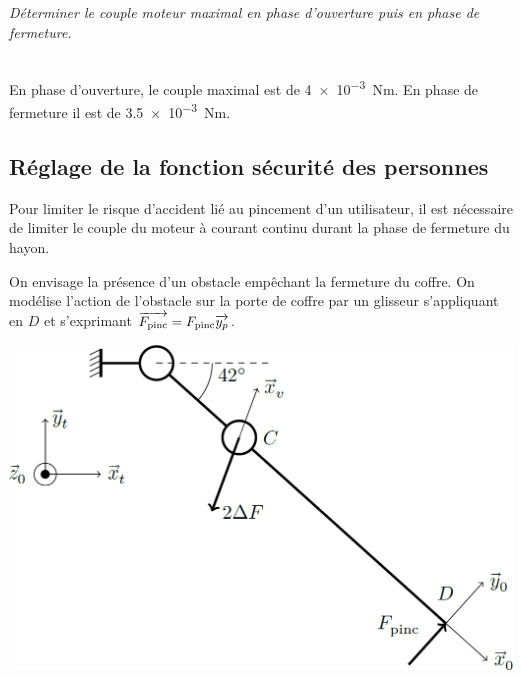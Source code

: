 \documentclass[10pt,fleqn]{article} %
\begin{document}
\begin{multicols}{2}
\subparagraph{}
\textit{Déterminer le couple moteur maximal en phase d’ouverture puis en phase de fermeture.}
\ifprof
\begin{corrige}~\\
En phase d'ouverture, le couple maximal est de \SI{4e-3}{Nm}. En phase de fermeture il est de \SI{3,5e-3}{Nm}.
\end{corrige}
\else
\fi


\subsection*{Réglage de la fonction sécurité des personnes}
Pour limiter le risque d’accident lié au pincement d’un utilisateur, il est nécessaire de limiter le couple du moteur
à courant continu durant la phase de fermeture du hayon. %



On envisage la présence d’un obstacle empêchant la fermeture du coffre. On modélise l’action de l’obstacle sur la porte de coffre par un glisseur s’appliquant en $D$ et s’exprimant $\overrightarrow{F_{\text{pinc}}} = F_{\text{pinc}}\overrightarrow{y_p}$.

\begin{center}
\includegraphics[width=\linewidth]{images/fig_05}
\end{center}




\end{multicols}
\end{document}
